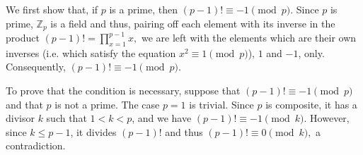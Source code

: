 \documentclass{article}
\renewcommand{\leq}{\leqslant}
\begin{document}

We first show that, if $p$ is a prime, then $(p-1)! \equiv -1 \pmod p.$ Since $p$ is prime, $\mathbb{Z}_p$ is a field and thus, pairing off each element with its inverse in the product $(p-1)! = \prod_{x=1}^{p-1}x,$ we are left with the elements which are their own inverses (i.e. which satisfy the equation $x^2 \equiv 1 \pmod p$), $1$ and $-1$, only. Consequently, $(p-1)! \equiv -1 \pmod p.$

To prove that the condition is necessary, suppose that $(p-1)! \equiv -1 \pmod p$ and that $p$ is not a prime. The case $p=1$ is trivial. Since $p$ is composite, it has a divisor $k$ such that $1 < k < p$, and we have $(p-1)! \equiv -1 \pmod k$. However, since $k\leq p-1$, it divides $(p-1)!$ and thus $(p-1)! \equiv 0 \pmod k,$ a contradiction.
\end{document}
